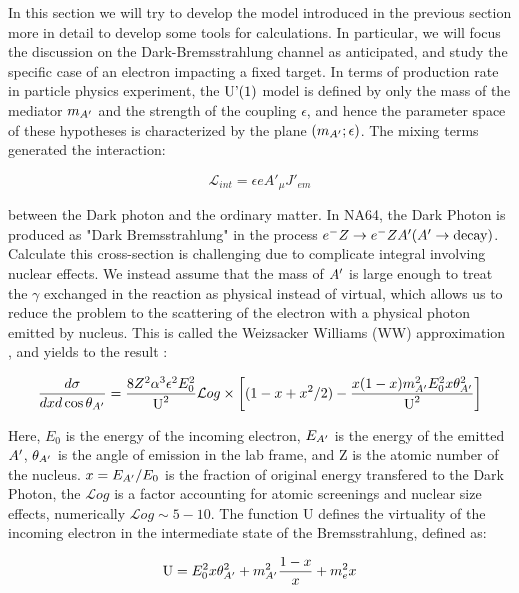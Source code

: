 In this section we will try to develop the model introduced in the previous section more in detail to develop some tools for calculations. In particular, we will focus the discussion on the Dark-Bremsstrahlung channel as anticipated, and study the specific case of an electron impacting a fixed target. In terms of production rate in particle physics experiment, the $\textrm{U'(1)}$ model is defined by only the mass of the mediator $m_{A'}$ and the strength of the coupling $\epsilon$, and hence the parameter space of these hypotheses is characterized by the plane $(m_{A'};\epsilon)$. The mixing terms generated the interaction:

\begin{equation}
  \label{eq:dm-interaction}
  \mathcal{L}_{int} = \epsilon e A'_{\mu}J'_{em}
\end{equation}

between the Dark photon and the ordinary matter. In NA64, the Dark Photon is produced as "Dark Bremsstrahlung" in the process $e^- Z \to e^- Z A'(A' \to \textrm{decay})$. Calculate this cross-section is challenging due to complicate integral involving nuclear effects. We instead assume that the mass of $A'$ is large enough to treat the $\gamma$ exchanged in the reaction as physical instead of virtual, which allows us to reduce the problem to the scattering of the electron with a physical photon emitted by nucleus. This is called the Weizsacker Williams (WW) approximation \cite{Kim:1973he}, and yields to the result \cite{jdb}:

\begin{equation}
  \label{eq:dm-diff-cross}
  \frac{d\sigma}{dxd\cos{\theta_{A'}}} = \frac{8 Z^2 \alpha^3 \epsilon^2 E^2_0}{\textrm{U}^2} \mathcal{L}og \times \left[ (1 - x + x^2/2) - \frac{x(1-x)m^2_{A'}E^2_0 x \theta^2_{A'}}{\textrm{U}^2} \right]
\end{equation}

Here, $E_0$ is the energy of the incoming electron, $E_{A'}$ is the energy of the emitted $A'$, $\theta_{A'}$ is the angle of emission in the lab frame, and Z is the atomic number of the nucleus. $x=E_{A'}/E_0$ is the fraction of original energy transfered to the Dark Photon, the $\mathcal{L}og$ is a factor accounting for atomic screenings and nuclear size effects, numerically $\mathcal{L}og \sim 5 - 10$. The function U defines the virtuality of the incoming electron in the intermediate state of the Bremsstrahlung, defined as:

\begin{equation}
  \label{eq:u-func}
  \textrm{U} = E^2_0 x \theta^2_{A'} + m^2_{A'} \frac{1 - x}{x} + m^2_e x
\end{equation}

